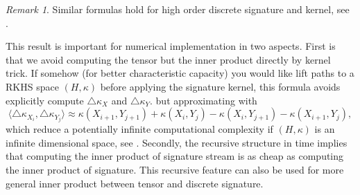 \documentclass[12pt]{report}
\theoremstyle{definition}
\theoremstyle{remark}
\newtheorem*{remark}{Remark}
\begin{document}
  \begin{remark}
    Similar formulas hold for high order discrete signature and kernel, see \cite{kiraly2019kernels}. 
  \end{remark}
  This result is important for numerical implementation in two aspects. First is that we avoid computing the tensor but the inner product directly by kernel trick. If somehow (for better characteristic capacity) you would like lift paths to a RKHS space $(H,\kappa)$ before applying the signature kernel, this formula avoids explicitly compute $\triangle\kappa_{X}$ and $\triangle\kappa_{Y}$. but approximating with
    \begin{equation}
      \langle\triangle\kappa_{X_{i}}, \triangle\kappa_{Y_{j}}\rangle\approx\kappa(X_{i+1},Y_{j+1}) + \kappa(X_{i},Y_{j}) - \kappa(X_{i},Y_{j+1}) - \kappa(X_{i+1},Y_{j}),
    \end{equation}
    which reduce a potentially infinite computational complexity if $(H,\kappa)$ is an infinite dimensional space, see \cite{chevyrev2018signature}. Secondly, the recursive structure in time implies that computing the inner product of signature stream is as cheap as computing the inner product of signature. This recursive feature can also be used for more general inner product between tensor and discrete signature. 
\end{document}
